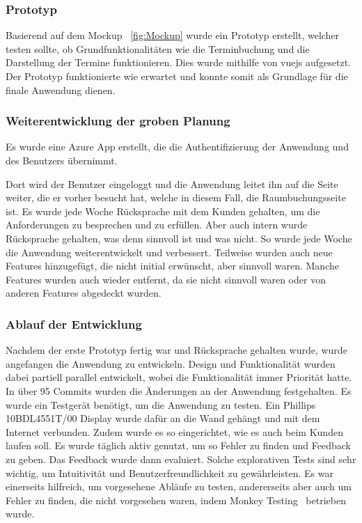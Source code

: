 \subsubsection{Prototyp}\label{subsubsec:prototyp}
Basierend auf dem Mockup ~\ref{fig:Mockup} wurde ein Prototyp erstellt, welcher testen sollte, ob Grundfunktionalitäten wie die Terminbuchung und die Darstellung der Termine funktionieren.
Dies wurde mithilfe von vuejs aufgesetzt.
\newline
Der Prototyp funktionierte wie erwartet und konnte somit als Grundlage für die finale Anwendung dienen.
\subsubsection{Weiterentwicklung der groben Planung}
Es wurde eine Azure App erstellt, die die Authentifizierung der Anwendung und des Benutzers übernimmt.
\newline

Dort wird der Benutzer eingeloggt und die Anwendung leitet ihn auf die Seite weiter, die er vorher besucht hat, welche in diesem Fall, die Raumbuchungsseite ist.
\newline
Es wurde jede Woche Rücksprache mit dem Kunden gehalten, um die Anforderungen zu besprechen und zu erfüllen.
Aber auch intern wurde Rücksprache gehalten, was denn sinnvoll ist und was nicht.
\newline
So wurde jede Woche die Anwendung weiterentwickelt und verbessert.
Teilweise wurden auch neue Features hinzugefügt, die nicht initial erwünscht, aber sinnvoll waren.
Manche Features wurden auch wieder entfernt, da sie nicht sinnvoll waren oder von anderen Features abgedeckt wurden.
\newline
\newline
\subsubsection{Ablauf der Entwicklung}
Nachdem der erste Prototyp fertig war und Rücksprache gehalten wurde, wurde angefangen die Anwendung zu entwickeln.
Design und Funktionalität wurden dabei partiell parallel entwickelt, wobei die Funktionalität immer Priorität hatte.
In über 95 Commits wurden die Änderungen an der Anwendung festgehalten.
\newline
Es wurde ein Testgerät benötigt, um die Anwendung zu testen.
Ein Phillips 10BDL4551T/00 Display wurde dafür an die Wand gehängt und mit dem Internet verbunden.
Zudem wurde es so eingerichtet, wie es auch beim Kunden laufen soll.
\newline
Es wurde täglich aktiv genutzt, um so Fehler zu finden und Feedback zu geben.
Das Feedback wurde dann evaluiert.
Solche explorativen Tests sind sehr wichtig, um Intuitivität und Benutzerfreundlichkeit zu gewährleisten.
Es war einerseits hilfreich, um vorgesehene Abläufe zu testen, andererseits aber auch um Fehler zu finden, die nicht vorgesehen waren, indem Monkey Testing~\cite{Monkey-Testing-Book1} betrieben wurde.
\newline
